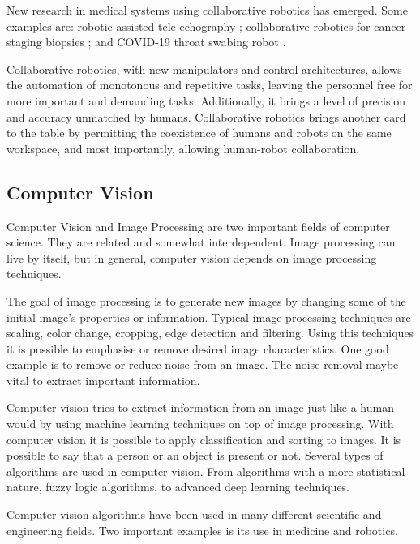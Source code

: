 New research in medical systems using collaborative robotics has emerged. Some examples are: robotic assisted tele-echography \cite{Santos2018_computed_torque_control_robotic_assisted_tele_ecography}; collaborative robotics for cancer staging biopsies \cite{Esposito2016_collaborative_robotics_cancer_staging_biopsies}; and COVID-19 throat swabing robot \cite{Dalgaard2020_covid19_swabing_robot}.

Collaborative robotics, with new manipulators and control architectures, allows the automation of monotonous and repetitive tasks, leaving the personnel free for more important and demanding tasks. Additionally, it brings a level of precision and accuracy unmatched by humans. Collaborative robotics brings another card to the table by permitting the coexistence of humans and robots on the same workspace, and most importantly, allowing human-robot collaboration.


\subsection{Computer Vision} %
\label{subsec:computer_vision}

Computer Vision and Image Processing are two important fields of computer science. They are related and somewhat interdependent. Image processing can live by itself, but in general, computer vision depends on image processing techniques.

The goal of image processing is to generate new images by changing some of the initial image's properties or information. Typical image processing techniques are scaling, color change, cropping, edge detection and filtering. Using this techniques it is possible to emphasise or remove desired image characteristics. One good example is to remove or reduce noise from an image. The noise removal maybe vital to extract important information.

Computer vision tries to extract information from an image just like a human would by using machine learning techniques on top of image processing. With computer vision it is possible to apply classification and sorting to images. It is possible to say that a person or an object is present or not. Several types of algorithms are used in computer vision. From algorithms with a more statistical nature, fuzzy logic algorithms, to advanced deep learning techniques.

Computer vision algorithms have been used in many different scientific and engineering fields. Two important examples is its use in medicine and robotics.

